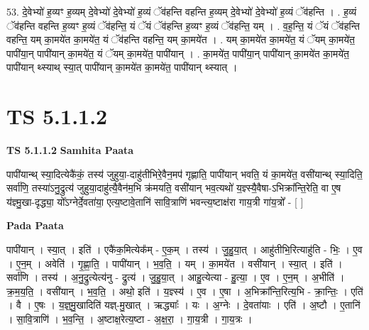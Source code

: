 \documentclass[17pt]{extarticle}
\begin{document}
53. दे॒वेभ्यो॑ ह॒व्यꣳ ह॒व्यम् दे॒वेभ्यो॑ दे॒वेभ्यो॑ ह॒व्यं ॅव॑हन्ति वहन्ति ह॒व्यम् दे॒वेभ्यो॑ दे॒वेभ्यो॑ ह॒व्यं ॅव॑हन्ति । . ह॒व्यं ॅव॑हन्ति वहन्ति ह॒व्यꣳ ह॒व्यं ॅव॑हन्ति॒ यं ॅयं ॅव॑हन्ति ह॒व्यꣳ ह॒व्यं ॅव॑हन्ति॒ यम् । . व॒ह॒न्ति॒ यं ॅयं ॅव॑हन्ति वहन्ति॒ यम् का॒मये॑त का॒मये॑त॒ यं ॅव॑हन्ति वहन्ति॒ यम् का॒मये॑त । . यम् का॒मये॑त का॒मये॑त॒ यं ॅयम् का॒मये॑त॒ पापी॑या॒न् पापी॑यान् का॒मये॑त॒ यं ॅयम् का॒मये॑त॒ पापी॑यान् । . का॒मये॑त॒ पापी॑या॒न् पापी॑यान् का॒मये॑त का॒मये॑त॒ पापी॑यान् थ्स्याथ् स्या॒त् पापी॑यान् का॒मये॑त का॒मये॑त॒ पापी॑यान् थ्स्यात् । \newline
\pagebreak
{}

\section{ TS 5.1.1.2 }

\textbf{TS 5.1.1.2 } \newline
\textbf{Samhita Paata} \newline

पापी॑यान्थ् स्या॒दित्येकै॑कं॒ तस्य॑ जुहुया॒-दाहु॑तीभिरे॒वैन॒मप॑ गृह्णाति॒ पापी॑यान् भवति॒ यं का॒मये॑त॒ वसी॑यान्थ् स्या॒दिति॒ सर्वा॑णि॒ तस्या॑ऽनु॒द्रुत्य॑ जुहुया॒दाहु॑त्यै॒वैन॑म॒भि क्र॑मयति॒ वसी॑यान् भव॒त्यथो॑ य॒ज्ञ्स्यै॒वैषा-ऽभिक्रा᳚न्ति॒रेति॒ वा ए॒ष य॑ज्ञ्मु॒खा-दृद्ध्या॒ यो᳚ऽग्नेर्दे॒वता॑या॒ एत्य॒ष्टावे॒तानि॑ सावि॒त्राणि॑ भवन्त्य॒ष्टाक्ष॑रा गाय॒त्री गा॑य॒त्रो᳚ - [  ] \newline

\textbf{Pada Paata} \newline

पापी॑यान् । स्या॒त् । इति॑ । एकै॑क॒मित्येक᳚म् - ए॒क॒म् । तस्य॑ । जु॒हु॒या॒त् । आहु॑तीभि॒रित्याहु॑ति - भिः॒ । ए॒व । ए॒न॒म् । अवेति॑ । गृ॒ह्णा॒ति॒ । पापी॑यान् । भ॒व॒ति॒ । यम् । का॒मये॑त । वसी॑यान् । स्या॒त् । इति॑ । सर्वा॑णि । तस्य॑ । अ॒नु॒द्रुत्येत्य॑नु - द्रुत्य॑ । जु॒हु॒या॒त् । आहु॒त्येत्या - हु॒त्या॒ । ए॒व । ए॒न॒म् । अ॒भीति॑ । क्र॒म॒य॒ति॒ । वसी॑यान् । भ॒व॒ति॒ । अथो॒ इति॑ । य॒ज्ञ्स्य॑ । ए॒व । ए॒षा । अ॒भिक्रा᳚न्ति॒रित्य॒भि -  क्रा॒न्तिः॒ । एति॑ । वै । ए॒षः । य॒ज्ञ्॒मु॒खादिति॑ यज्ञ्-मु॒खात् । ऋद्ध्याः᳚ । यः । अ॒ग्नेः । दे॒वता॑याः । एति॑ । अ॒ष्टौ । ए॒तानि॑ । सा॒वि॒त्राणि॑ । भ॒व॒न्ति॒ । अ॒ष्टाक्ष॒रेत्य॒ष्टा - अ॒क्ष॒रा॒ । गा॒य॒त्री । गा॒य॒त्रः ।  \newline
\end{document}
